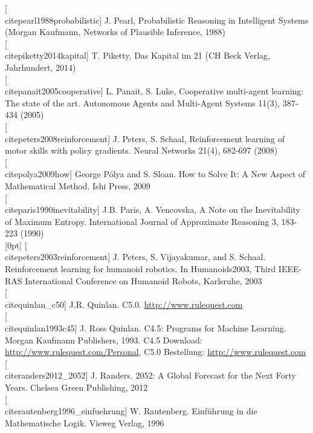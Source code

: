 \documentclass[10pt]{book}
\begin{document}
[\\cite{pearl1988probabilistic}] J. Pearl, Probabilistic Reasoning in Intelligent Systems (Morgan Kaufmann, Networks of Plausible Inference, 1988)\\[0pt]
[\\cite{piketty2014kapital}] T. Piketty, Das Kapital im 21 (CH Beck Verlag, Jahrhundert, 2014)\\[0pt]
[\\cite{panait2005cooperative}] L. Panait, S. Luke, Cooperative multi-agent learning: The state of the art. Autonomous Agents and Multi-Agent Systems 11(3), 387-434 (2005)\\[0pt]
[\\cite{peters2008reinforcement}] J. Peters, S. Schaal, Reinforcement learning of motor skills with policy gradients. Neural Networks 21(4), 682-697 (2008)\\[0pt]
[\\cite{polya2009how}] George Pólya and S. Sloan. How to Solve It: A New Aspect of Mathematical Method. Ishi Press, 2009\\[0pt]
[\\cite{paris1990inevitability}] J.B. Paris, A. Vencovska, A Note on the Inevitability of Maximum Entropy. International Journal of Approximate Reasoning 3, 183-223 (1990)\\
[0pt]
[\\cite{peters2003reinforcement}] J. Peters, S. Vijayakumar, and S. Schaal. Reinforcement learning for humanoid robotics. In Humanoids2003, Third IEEE-RAS International Conference on Humanoid Robots, Karlsruhe, 2003\\[0pt]
[\\cite{quinlan_c50}] J.R. Quinlan. C5.0. \href{http://www.rulequest.com}{http://www.rulequest.com}\\[0pt]
[\\cite{quinlan1993c45}] J. Ross Quinlan. C4.5: Programs for Machine Learning. Morgan Kaufmann Publishers, 1993. C4.5 Download: \href{http://www.rulequest.com/Personal}{http://www.rulequest.com/Personal}, C5.0 Bestellung: \href{http://www.rulequest.com}{http://www.rulequest.com}\\[0pt]
[\\cite{randers2012_2052}] J. Randers. 2052: A Global Forecast for the Next Forty Years. Chelsea Green Publishing, 2012\\[0pt]
[\\cite{rautenberg1996_einfuehrung}] W. Rautenberg. Einführung in die Mathematische Logik. Vieweg Verlag, 1996\\[0pt]
\end{document}
